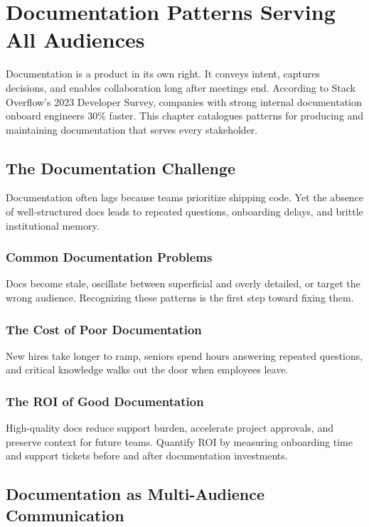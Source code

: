 \chapter{Documentation Patterns Serving All Audiences}
\label{ch:documentation-patterns}

Documentation is a product in its own right. It conveys intent, captures decisions, and enables collaboration long after meetings end. According to Stack Overflow’s 2023 Developer Survey, companies with strong internal documentation onboard engineers 30\% faster. This chapter catalogues patterns for producing and maintaining documentation that serves every stakeholder.

\section{The Documentation Challenge}
\label{sec:doc-challenge}

Documentation often lags because teams prioritize shipping code. Yet the absence of well-structured docs leads to repeated questions, onboarding delays, and brittle institutional memory.

\subsection{Common Documentation Problems}
Docs become stale, oscillate between superficial and overly detailed, or target the wrong audience. Recognizing these patterns is the first step toward fixing them.

\subsection{The Cost of Poor Documentation}
New hires take longer to ramp, seniors spend hours answering repeated questions, and critical knowledge walks out the door when employees leave.

\subsection{The ROI of Good Documentation}
High-quality docs reduce support burden, accelerate project approvals, and preserve context for future teams. Quantify ROI by measuring onboarding time and support tickets before and after documentation investments.

\section{Documentation as Multi-Audience Communication}
\label{sec:multi-audience}

